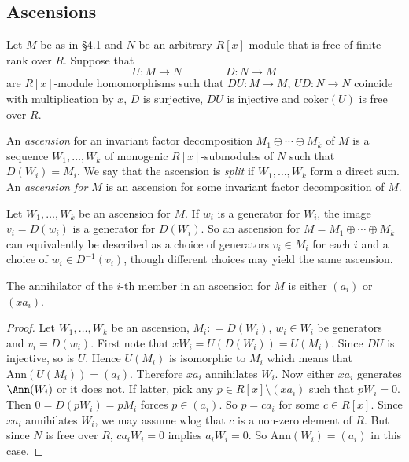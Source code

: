 \subsection{Ascensions}      \label{ascensec}    Let $ M $ be as in \S4.1  and $ N $ be an arbitrary $R[x]$-module that is free of finite rank over $ R  $. Suppose that    
$$ U : M \to N \quad \quad  \quad \quad D : N \to M  $$ 
are $ R[x]$-module homomorphisms such that $ DU : M \to M  $, $  UD : N \to N $ coincide with multiplication by $ x $, $ D $ is surjective, $ DU $ is injective and $ \mathrm{coker}(U) $ is free over $ R $.   

\begin{definition} An \emph{ascension} for an invariant factor decomposition $ M_{1} \oplus \cdots \oplus M_{k}  $ of $ M $ is a sequence $ W_{1} ,   \ldots,  W_{k} $ of monogenic $ R[x]$-submodules of $ N $ such that $ D(W_{i})  =  M_{i}  $.  We say that  the ascension is \emph{split} if   $ W_{1} , \ldots, W_{k} $ form a direct sum.  An \emph{ascension for $ M $}     is an ascension for some invariant factor decomposition of $ M $.    
\end{definition} 

Let $ W_{1}, \ldots, W_{k} $ be an ascension for $ M $. If $ w_{i} $ is a generator for $ W_{i} $, the image $ v_{i} = D(w_{i}) $ is a generator for $ 
D(W_{i}    )     $. So an ascension for $ M = M_{1} \oplus \cdots \oplus M_{k} $ can equivalently be described as a choice of generators $ v_{i} \in M_{i} $ for each $ i $ and a choice of $ w_{i} \in D^{-1} (v_{i}) $, though different choices may yield the same ascension. 


\begin{lemma}  \label{annascen}     The annihilator of the $i$-th member in an ascension for $ M $   is    either $ (a_{i})  $ or $ (x a_{i}) $. 
\end{lemma} 

\begin{proof}   Let $ W_{1}, \ldots , W_{k} $ be an ascension, $ M _{i} : = D(W_{i}) $,  $ w_{i} \in W_{i} $ be generators and $ v_{i} = D(w_{i}) $.     First note that  $ x W_{i} = U(D (W_{i})) = U(M_{i}) $. Since $ DU $ is injective, so is $ U$. Hence $ U(M_{i})  $ is isomorphic to $ M_{i} $ which means that $  \mathrm{Ann}(U(M_{i})) = (a_{i}) $. Therefore $ xa_{i} $ annihilates $ W_{i} $.  Now either $ x a_{i} $ generates $ \Ann(W_{i}) $ or it does not.     If latter, pick any  $ p \in R[x] \setminus (x a_{i} ) $ such that $ p W_{i} = 0 $.  Then $ 0  =  D(p W_{i}) = p M_{i}  $  forces  $ p \in (a_{i} ) $. So $ p = c a_{i} $ for some $ c \in R[x] $. Since $ x a_{i} $ annihilates $ W_{i} $,  we may assume wlog that $ c $ is a non-zero element of $ R $.  But since $  N $ is free over $ R $, $ ca_{i} W_{i} = 0 $ implies $ a_{i}W_{i} = 0 $. So $  \mathrm{Ann}(W_{i} ) = (a_{i}) $ in this  case. 
\end{proof} 
 

